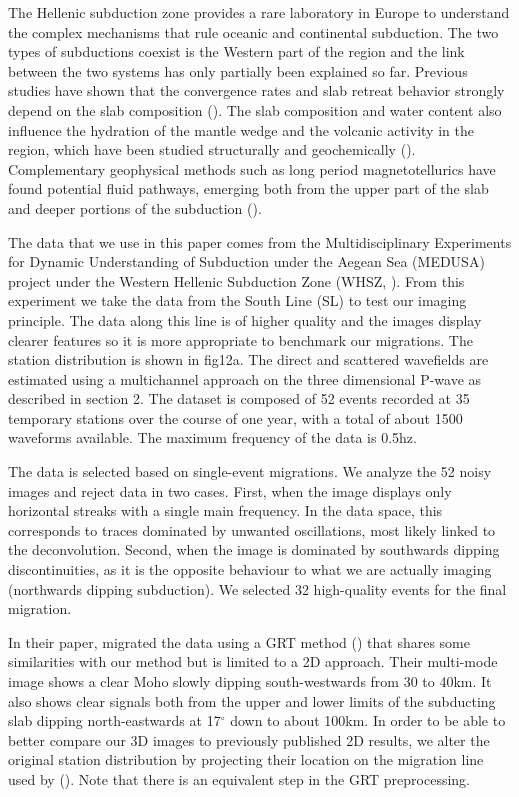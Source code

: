 \documentclass[9pt,a4paper]{article}
\numberwithin{equation}{section}
\begin{document}
\begin{multicols}{2}
The Hellenic subduction zone provides a rare laboratory in Europe to understand the complex mechanisms that rule oceanic and continental subduction.
The two types of subductions coexist is the Western part of the region and the link between the two systems has only partially been explained so far.
Previous studies have shown that the convergence rates and slab retreat behavior strongly depend on the slab composition (\cite{papa_tecto_07}).
The slab composition and water content also influence the hydration of the mantle wedge and the volcanic activity in the region, which have been studied structurally and geochemically (\cite{pepi_gsa_07}).
Complementary geophysical methods such as long period magnetotellurics have found potential fluid pathways, emerging both from the upper part of the slab and deeper portions of the subduction (\cite{gala_tphy_05}).

The data that we use in this paper comes from the Multidisciplinary Experiments for Dynamic Understanding of Subduction under the Aegean Sea (MEDUSA) project under the Western Hellenic Subduction Zone (WHSZ, \cite{pear_jgr_12}).
From this experiment we take the data from the South Line (SL) to test our imaging principle.
The data along this line is of higher quality and the images display clearer features so it is more appropriate to benchmark our migrations.
The station distribution is shown in fig12a.
The direct and scattered wavefields are estimated using a multichannel approach on the three dimensional P-wave as described in section 2.
The dataset is composed of 52 events recorded at 35 temporary stations over the course of one year, with a total of about 1500 waveforms available.
The maximum frequency of the data is 0.5hz.

The data is selected based on single-event migrations.
We analyze the 52 noisy images and reject data in two cases.
First, when the image displays only horizontal streaks with a single main frequency.
In the data space, this corresponds to traces dominated by unwanted oscillations, most likely linked to the deconvolution.
Second, when the image is dominated by southwards dipping discontinuities, as it is the opposite behaviour to what we are actually imaging (northwards dipping subduction).
We selected 32 high-quality events for the final migration.

In their paper, \cite{pear_jgr_12} migrated the data using a GRT method (\cite{bost_jgr_01}) that shares some similarities with our method but is limited to a 2D approach.
Their multi-mode image shows a clear Moho slowly dipping south-westwards from 30 to 40km.
It also shows clear signals both from the upper and lower limits of the subducting slab dipping north-eastwards at 17$^{\circ}$ down to about 100km.
In order to be able to better compare our 3D images to previously published 2D results, we alter the original station distribution by projecting their location on the migration line used by (\cite{pear_jgr_12}).
Note that there is an equivalent step in the GRT preprocessing.


\end{multicols}
\end{document}
